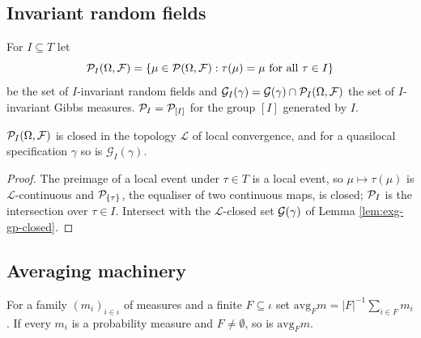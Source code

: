 \subsection*{Invariant random fields}

\begin{definition}[Georgii (5.12), (5.13)]
    \label{def:sym-invariant-fields}

    For $I \subseteq T$ let
    \[
      \mathcal{P}_I(\Omega,\mathcal{F}) = \left\{ \mu \in \mathcal{P}(\Omega,\mathcal{F}) :
        \tau(\mu) = \mu \text{ for all } \tau \in I \right\}
    \]
    be the set of $I$-invariant random fields and
    $\mathcal{G}_I(\gamma) = \mathcal{G}(\gamma) \cap \mathcal{P}_I(\Omega,\mathcal{F})$ the set of
    $I$-invariant Gibbs measures. $\mathcal{P}_I = \mathcal{P}_{[I]}$ for the group $[I]$ generated by $I$.
\end{definition}

\begin{lemma}
    \label{lem:sym-closed-invariant}
    \leanok

    $\mathcal{P}_I(\Omega,\mathcal{F})$ is closed in the topology $\mathcal{L}$ of local convergence, and
    for a quasilocal specification $\gamma$ so is $\mathcal{G}_I(\gamma)$.
\end{lemma}
\begin{proof}
    \leanok

    The preimage of a local event under $\tau \in T$ is a local event, so
    $\mu \mapsto \tau(\mu)$ is $\mathcal{L}$-continuous and $\mathcal{P}_{\left\{ \tau \right\}}$, the equaliser of
    two continuous maps, is closed; $\mathcal{P}_I$ is the intersection over $\tau \in I$. Intersect
    with the $\mathcal{L}$-closed set $\mathcal{G}(\gamma)$ of Lemma \ref{lem:exg-gp-closed}.
\end{proof}

\subsection*{Averaging machinery}

\begin{definition}
    \label{def:sym-uniform-average}
    \leanok

    For a family $(m_i)_{i \in \iota}$ of measures and a finite $F \subseteq \iota$ set
    $\mathrm{avg}_F m = |F|^{-1}\sum_{i \in F} m_i$. If every $m_i$ is a probability measure and
    $F \neq \emptyset$, so is $\mathrm{avg}_F m$.
\end{definition}

